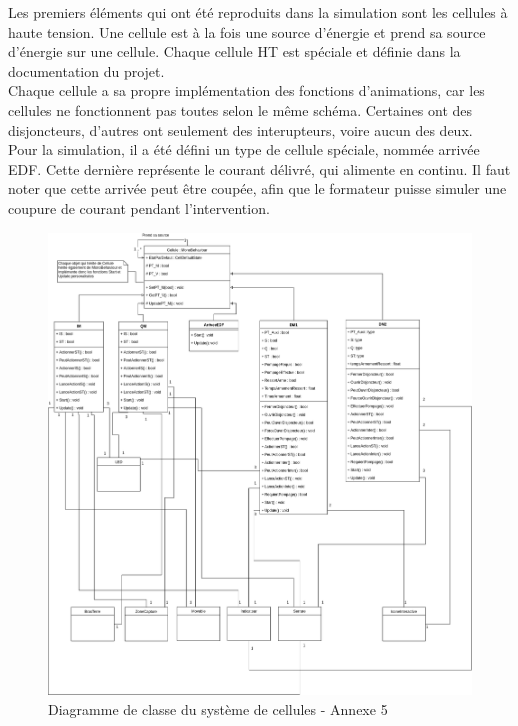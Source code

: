 \documentclass[a4paper]{article}
\begin{document}
    Les premiers éléments qui ont été reproduits dans la simulation sont les cellules à haute tension. Une cellule est à la fois une source d'énergie et prend sa source d'énergie sur une cellule. Chaque cellule HT est spéciale et définie dans la documentation du projet. \\

    Chaque cellule a sa propre implémentation des fonctions d'animations, car les cellules ne fonctionnent pas toutes selon le même schéma. Certaines ont des disjoncteurs, d'autres ont seulement des interupteurs, voire aucun des deux. \\

    Pour la simulation, il a été défini un type de cellule spéciale, nommée arrivée EDF. Cette dernière représente le courant délivré, qui alimente en continu. Il faut noter que cette arrivée peut être coupée, afin que le formateur puisse simuler une coupure de courant pendant l'intervention. \\

    \begin{figure}[H]
        \centering
        \includegraphics[scale=0.2]{img/DiagClassCellules}
        \caption{Diagramme de classe du système de cellules - Annexe 5}
    \end{figure}
\end{document}
